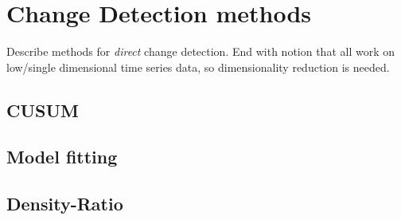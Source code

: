 \section{Change Detection methods}\label{sec:change_detection_methods}
Describe methods for \emph{direct} change detection. End with notion that all work on low/single dimensional time series data, so dimensionality reduction is needed.

\subsection{CUSUM}

\subsection{Model fitting}

\subsection{Density-Ratio}